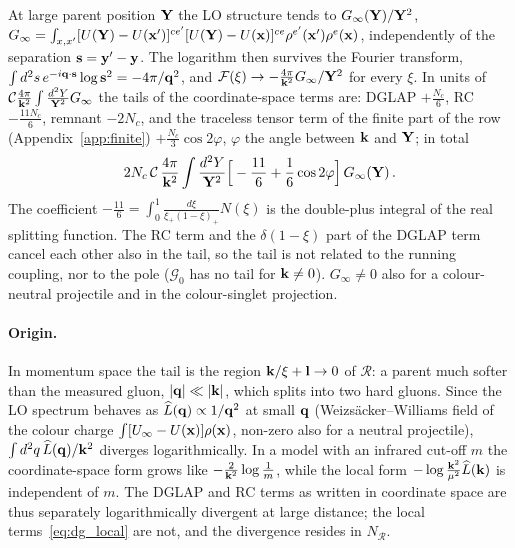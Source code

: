At large parent position $\mathbf{Y}$ the LO structure tends to $G_\infty(\mathbf{Y})/\mathbf{Y}^2$, $G_\infty=\int_{x,x'}[U(\mathbf{Y})-U(\mathbf{x}')]^{ce'}[U(\mathbf{Y})-U(\mathbf{x})]^{ce}\rho^{e'}(\mathbf{x}')\rho^e(\mathbf{x})$, independently of the separation $\mathbf{s}=\mathbf{y}'-\mathbf{y}$. The logarithm then survives the Fourier transform, $\int d^2s\,e^{-i\mathbf{q}\cdot\mathbf{s}}\log\mathbf{s}^2=-4\pi/\mathbf{q}^2$, and $\mathcal F(\xi)\to-\frac{4\pi}{\mathbf{k}^2}G_\infty/\mathbf{Y}^2$ for every $\xi$. In units of $\mathcal C\frac{4\pi}{\mathbf{k}^2}\int\frac{d^2Y}{\mathbf{Y}^2}G_\infty$ the tails of the coordinate-space terms are: DGLAP $+\frac{N_c}{6}$, RC $-\frac{11N_c}{6}$, remnant $-2N_c$, and the traceless tensor term of the finite part of the row (Appendix~\ref{app:finite}) $+\frac{N_c}{3}\cos2\varphi$, $\varphi$ the angle between $\mathbf{k}$ and $\mathbf{Y}$; in total
\begin{align}\label{eq:dg_tailtot}
2N_c\,\mathcal C\,\frac{4\pi}{\mathbf{k}^2}\int\frac{d^2Y}{\mathbf{Y}^2}\Big[-\frac{11}{6}+\frac16\cos2\varphi\Big]\,G_\infty(\mathbf{Y})\,.
\end{align}
The coefficient $-\frac{11}{6}=\int_0^1\frac{d\xi}{\xi_+(1-\xi)_+}N(\xi)$ is the double-plus integral of the real splitting function. The RC term and the $\delta(1-\xi)$ part of the DGLAP term cancel each other also in the tail, so the tail is not related to the running coupling, nor to the pole ($\mathcal G_0$ has no tail for $\mathbf{k}\neq0$). $G_\infty\neq0$ also for a colour-neutral projectile and in the colour-singlet projection.

\paragraph{Origin.} In momentum space the tail is the region $\mathbf{k}/\xi+\mathbf{l}\to0$ of $\mathcal R$: a parent much softer than the measured gluon, $|\mathbf{q}|\ll|\mathbf{k}|$, which splits into two hard gluons. Since the LO spectrum behaves as $\widehat L(\mathbf{q})\propto1/\mathbf{q}^2$ at small $\mathbf{q}$ (Weizs\"acker--Williams field of the colour charge $\int[U_\infty-U(\mathbf{x})]\rho(\mathbf{x})$, non-zero also for a neutral projectile), $\int d^2q\,\widehat L(\mathbf{q})/\mathbf{k}^2$ diverges logarithmically. In a model with an infrared cut-off $m$ the coordinate-space form grows like $-\frac{2}{\mathbf{k}^2}\log\frac1m$, while the local form $-\log\frac{\mathbf{k}^2}{\mu^2}\widehat L(\mathbf{k})$ is independent of $m$. The DGLAP and RC terms as written in coordinate space are thus separately logarithmically divergent at large distance; the local terms~\eqref{eq:dg_local} are not, and the divergence resides in $N_{\mathcal R}$.

